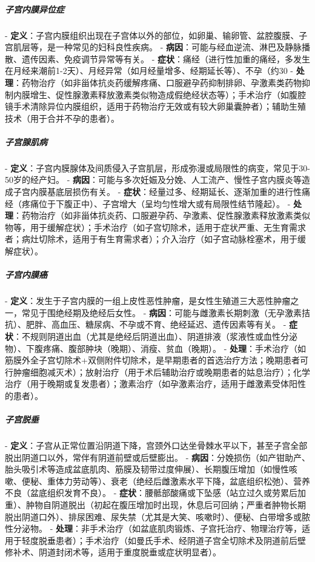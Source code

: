 \begin{enumerate}
\subparagraph{子宫内膜异位症}
- \textbf{定义}：子宫内膜组织出现在子宫体以外的部位，如卵巢、输卵管、盆腔腹膜、子宫肌层等，是一种常见的妇科良性疾病。
- \textbf{病因}：可能与经血逆流、淋巴及静脉播散、遗传因素、免疫调节异常等有关。
- \textbf{症状}：痛经（进行性加重的痛经，多发生在月经来潮前1-2天）、月经异常（如月经量增多、经期延长等）、不孕（约30%
- \textbf{处理}：药物治疗（如非甾体抗炎药缓解疼痛、口服避孕药抑制排卵、孕激素类药物抑制内膜增生、促性腺激素释放激素类似物造成假绝经状态等）；手术治疗（如腹腔镜手术清除异位内膜组织，适用于药物治疗无效或有较大卵巢囊肿者）；辅助生殖技术（用于合并不孕的患者）。

\subparagraph{子宫腺肌病}
- \textbf{定义}：子宫内膜腺体及间质侵入子宫肌层，形成弥漫或局限性的病变，常见于30-50岁的经产妇。
- \textbf{病因}：可能与多次妊娠及分娩、人工流产、慢性子宫内膜炎等造成子宫内膜基底层损伤有关。
- \textbf{症状}：经量过多、经期延长、逐渐加重的进行性痛经（疼痛位于下腹正中）、子宫增大（呈均匀性增大或有局限性结节隆起）。
- \textbf{处理}：药物治疗（如非甾体抗炎药、口服避孕药、孕激素、促性腺激素释放激素类似物等，用于缓解症状）；手术治疗（如子宫切除术，适用于症状严重、无生育需求者；病灶切除术，适用于有生育需求者）；介入治疗（如子宫动脉栓塞术，用于缓解症状）。

\subparagraph{子宫内膜癌}
- \textbf{定义}：发生于子宫内膜的一组上皮性恶性肿瘤，是女性生殖道三大恶性肿瘤之一，常见于围绝经期及绝经后女性。
- \textbf{病因}：可能与雌激素长期刺激（无孕激素拮抗）、肥胖、高血压、糖尿病、不孕或不育、绝经延迟、遗传因素等有关。
- \textbf{症状}：不规则阴道出血（尤其是绝经后阴道出血）、阴道排液（浆液性或血性分泌物）、下腹疼痛、腹部肿块（晚期）、消瘦、贫血（晚期）。
- \textbf{处理}：手术治疗（如筋膜外全子宫切除术+双侧附件切除术，是早期患者的首选治疗方法；晚期患者可行肿瘤细胞减灭术）；放射治疗（用于术后辅助治疗或晚期患者的姑息治疗）；化学治疗（用于晚期或复发患者）；激素治疗（如孕激素治疗，适用于雌激素受体阳性的患者）。

\subparagraph{子宫脱垂}
- \textbf{定义}：子宫从正常位置沿阴道下降，宫颈外口达坐骨棘水平以下，甚至子宫全部脱出阴道口以外，常伴有阴道前壁或后壁膨出。
- \textbf{病因}：分娩损伤（如产钳助产、胎头吸引术等造成盆底肌肉、筋膜及韧带过度伸展）、长期腹压增加（如慢性咳嗽、便秘、重体力劳动等）、衰老（绝经后雌激素水平下降，盆底组织松弛）、营养不良（盆底组织发育不良）。
- \textbf{症状}：腰骶部酸痛或下坠感（站立过久或劳累后加重）、肿物自阴道脱出（初起在腹压增加时出现，休息后可回纳；严重者肿物长期脱出阴道口外）、排尿困难、尿失禁（尤其是大笑、咳嗽时）、便秘、白带增多或脓性分泌物。
- \textbf{处理}：非手术治疗（如盆底肌肉锻炼、子宫托治疗、物理治疗等，适用于轻度脱垂患者）；手术治疗（如曼氏手术、经阴道子宫全切除术及阴道前后壁修补术、阴道封闭术等，适用于重度脱垂或症状明显者）。


\end{enumerate}
